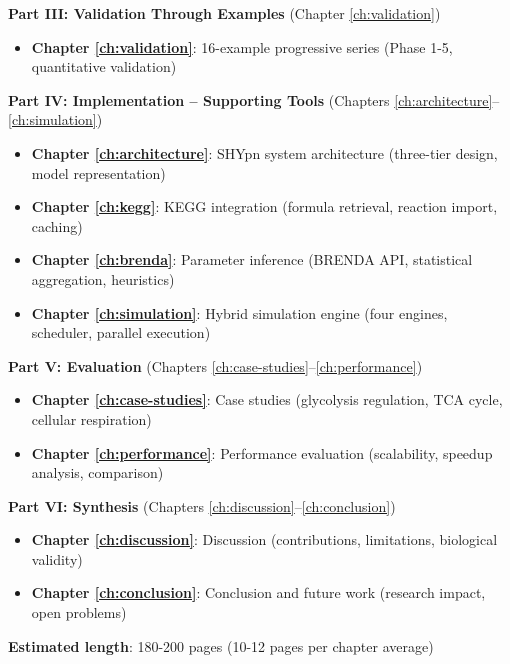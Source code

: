 \textbf{Part III: Validation Through Examples} (Chapter \ref{ch:validation})

\begin{itemize}
    \item \textbf{Chapter \ref{ch:validation}}: 16-example progressive series (Phase 1-5, quantitative validation)
\end{itemize}

\textbf{Part IV: Implementation -- Supporting Tools} (Chapters \ref{ch:architecture}--\ref{ch:simulation})

\begin{itemize}
    \item \textbf{Chapter \ref{ch:architecture}}: SHYpn system architecture (three-tier design, model representation)
    \item \textbf{Chapter \ref{ch:kegg}}: KEGG integration (formula retrieval, reaction import, caching)
    \item \textbf{Chapter \ref{ch:brenda}}: Parameter inference (BRENDA API, statistical aggregation, heuristics)
    \item \textbf{Chapter \ref{ch:simulation}}: Hybrid simulation engine (four engines, scheduler, parallel execution)
\end{itemize}

\textbf{Part V: Evaluation} (Chapters \ref{ch:case-studies}--\ref{ch:performance})

\begin{itemize}
    \item \textbf{Chapter \ref{ch:case-studies}}: Case studies (glycolysis regulation, TCA cycle, cellular respiration)
    \item \textbf{Chapter \ref{ch:performance}}: Performance evaluation (scalability, speedup analysis, comparison)
\end{itemize}

\textbf{Part VI: Synthesis} (Chapters \ref{ch:discussion}--\ref{ch:conclusion})

\begin{itemize}
    \item \textbf{Chapter \ref{ch:discussion}}: Discussion (contributions, limitations, biological validity)
    \item \textbf{Chapter \ref{ch:conclusion}}: Conclusion and future work (research impact, open problems)
\end{itemize}

\textbf{Estimated length}: 180-200 pages (10-12 pages per chapter average)

